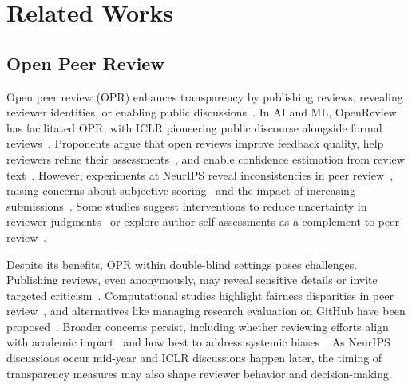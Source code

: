 \section{Related Works}

\subsection{Open Peer Review}

Open peer review (OPR) enhances transparency by publishing reviews, revealing reviewer identities, or enabling public discussions~\cite{ross2017open, henriquez2023open, wolfram2020open}. In AI and ML, OpenReview~\cite{openreview_api} has facilitated OPR, with ICLR pioneering public discourse alongside formal reviews~\cite{wang2023have}. Proponents argue that open reviews improve feedback quality, help reviewers refine their assessments~\cite{church2024peer}, and enable confidence estimation from review text~\cite{bharti2022confident}. However, experiments at NeurIPS reveal inconsistencies in peer review~\cite{cortes2021inconsistency, Lawrence2022NeurIPSExperiment, beygelzimer2023has}, raising concerns about subjective scoring~\cite{xie2024reviewer} and the impact of increasing submissions~\cite{tran2021an}. Some studies suggest interventions to reduce uncertainty in reviewer judgments~\cite{chen2023judgment} or explore author self-assessments as a complement to peer review~\cite{su2024analysis}.

Despite its benefits, OPR within double-blind settings poses challenges. Publishing reviews, even anonymously, may reveal sensitive details or invite targeted criticism~\cite{tran2021an}. Computational studies highlight fairness disparities in peer review~\cite{zhang2022investigating}, and alternatives like managing research evaluation on GitHub have been proposed~\cite{takagi2022managing}. Broader concerns persist, including whether reviewing efforts align with academic impact~\cite{church2024peer} and how best to address systemic biases~\cite{shah2022challenges}. As NeurIPS discussions occur mid-year and ICLR discussions happen later, the timing of transparency measures may also shape reviewer behavior and decision-making.



